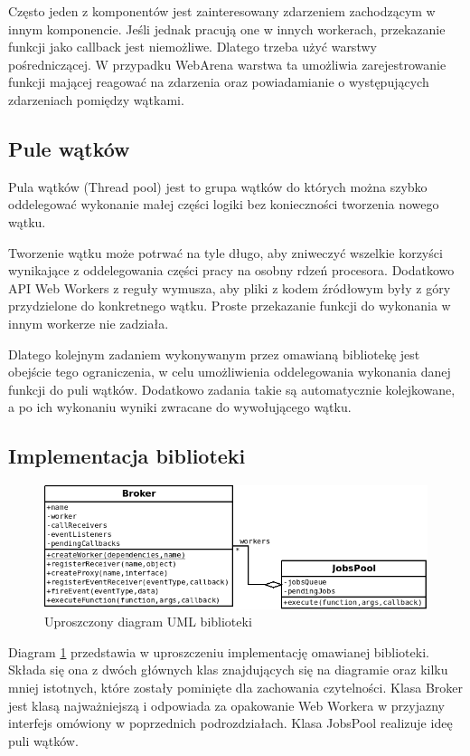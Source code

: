 Często jeden z komponentów jest zainteresowany zdarzeniem zachodzącym w innym komponencie.
Jeśli jednak pracują one w innych workerach, przekazanie funkcji jako callback jest
niemożliwe. Dlatego trzeba użyć warstwy pośredniczącej. W przypadku WebArena warstwa ta
umożliwia zarejestrowanie funkcji mającej reagować na zdarzenia oraz powiadamianie o występujących
zdarzeniach pomiędzy wątkami.

\subsection{Pule wątków}
\label{ssec:puleWatkow}
Pula wątków (Thread pool) jest to grupa wątków do których można szybko oddelegować wykonanie
małej części logiki bez konieczności tworzenia nowego wątku.

Tworzenie wątku może potrwać na tyle długo, aby zniweczyć wszelkie korzyści wynikające z oddelegowania
części pracy na osobny rdzeń procesora. Dodatkowo API Web Workers z reguły wymusza, aby pliki
z kodem źródłowym były z góry
przydzielone do konkretnego wątku. Proste przekazanie funkcji do wykonania w innym workerze nie zadziała.

Dlatego kolejnym zadaniem wykonywanym przez omawianą bibliotekę jest obejście tego ograniczenia, w celu
umożliwienia oddelegowania wykonania danej funkcji do puli wątków. Dodatkowo zadania takie są automatycznie
kolejkowane, a po ich wykonaniu wyniki zwracane do wywołującego wątku.

\subsection{Implementacja biblioteki}

\begin{figure}[h]
  \centering
  \includegraphics[scale=0.6]{zasoby/rozdzial31/broker}  
  \caption{Uproszczony diagram UML biblioteki}
  \label{fig:broker}
\end{figure}

Diagram \ref{fig:broker} przedstawia w uproszczeniu implementację omawianej biblioteki. Składa się ona
z dwóch głównych klas znajdujących się na diagramie oraz kilku mniej istotnych, które zostały pominięte
dla zachowania czytelności. Klasa Broker jest klasą najważniejszą i odpowiada za opakowanie Web Workera
w przyjazny interfejs omówiony w poprzednich podrozdziałach. Klasa JobsPool realizuje ideę puli wątków.

